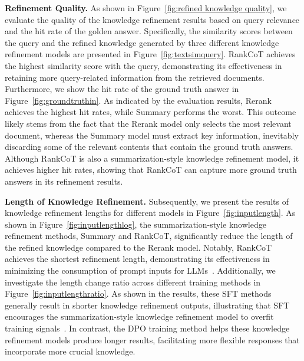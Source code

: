 \textbf{Refinement Quality.} As shown in Figure~\ref{fig:refined knowledge quality}, we evaluate the quality of the knowledge refinement results based on query relevance and the hit rate of the golden answer. Specifically, the similarity scores between the query and the refined knowledge generated by three different knowledge refinement models are presented in Figure~\ref{fig:textsimquery}. RankCoT achieves the highest similarity score with the query, demonstrating its effectiveness in retaining more query-related information from the retrieved documents. Furthermore, we show the hit rate of the ground truth answer in Figure~\ref{fig:groundtruthin}. As indicated by the evaluation results, Rerank achieves the highest hit rates, while Summary performs the worst. This outcome likely stems from the fact that the Rerank model only selects the most relevant document, whereas the Summary model must extract key information, inevitably discarding some of the relevant contents that contain the ground truth answers. Although RankCoT is also a summarization-style knowledge refinement model, it achieves higher hit rates, showing that RankCoT can capture more ground truth answers in its refinement results.

\textbf{Length of Knowledge Refinement.} Subsequently, we present the results of knowledge refinement lengths for different models in Figure~\ref{fig:inputlength}. As shown in Figure~\ref{fig:inputlengthlog}, the summarization-style knowledge refinement methods, Summary and RankCoT, significantly reduce the length of the refined knowledge compared to the Rerank model. Notably, RankCoT achieves the shortest refinement length, demonstrating its effectiveness in minimizing the consumption of prompt inputs for LLMs~\cite{mu2023learning}. Additionally, we investigate the length change ratio across different training methods in Figure~\ref{fig:inputlengthratio}. As shown in the results, these SFT methods generally result in shorter knowledge refinement outputs, illustrating that SFT encourages the summarization-style knowledge refinement model to overfit training signals~\cite{li2024rag}. In contrast, the DPO training method helps these knowledge refinement models produce longer results, facilitating more flexible responses that incorporate more crucial knowledge.



